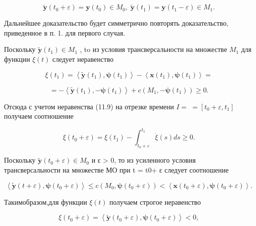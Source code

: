 \documentclass[8pt]{extarticle}
\begin{document}
\[
\widetilde{\mathbf{y}}\left( {{t}_{0} + \varepsilon }\right)  = \mathbf{y}\left( {t}_{0}\right)  \in  {M}_{0},\;\widetilde{\mathbf{y}}\left( {t}_{1}\right)  = \mathbf{y}\left( {{t}_{1} - \varepsilon }\right)  \in  {M}_{1}.
\]

Дальнейшее доказательство будет симметрично повторять доказательство, приведенное в п. 1. для первого случая.

Поскольку \(\widetilde{\mathbf{y}}\left( {t}_{1}\right)  \in  {M}_{1}\) , to из условия трансверсальности на множестве \({M}_{1}\) для функции \(\xi \left( t\right)\) следует неравенство

\[
\xi \left( {t}_{1}\right)  = \left\langle  {\widetilde{\mathbf{y}}\left( {t}_{1}\right) ,\mathbf{\psi }\left( {t}_{1}\right) }\right\rangle   - \left\langle  {\mathbf{x}\left( {t}_{1}\right) ,\mathbf{\psi }\left( {t}_{1}\right) }\right\rangle   =
\]

\[
=  - \left\langle  {\widetilde{\mathbf{y}}\left( {t}_{1}\right) , - \mathbf{\psi }\left( {t}_{1}\right) }\right\rangle   + c\left( {{M}_{1}, - \mathbf{\psi }\left( {t}_{1}\right) }\right)  \geq  0.
\]

Отсюда с учетом неравенства (11.9) на отрезке времени \(I = \; = \left\lbrack  {{t}_{0} + \varepsilon ,{t}_{1}}\right\rbrack\) получаем соотношение

\[
\xi \left( {{t}_{0} + \varepsilon }\right)  = \xi \left( {t}_{1}\right)  - {\int }_{{t}_{0} + \varepsilon }^{{t}_{1}}\dot{\xi }\left( s\right) {ds} \geq  0. \tag{11.12}
\]

Поскольку \(\widetilde{\mathbf{y}}\left( {{t}_{0} + \varepsilon }\right)  \in  {M}_{0}\) и ε > 0, то из усиленного условия трансверсальности на множестве МО при t = t0+ ε следует соотношение

\[
\left\langle  {\widetilde{\mathbf{y}}\left( {t + \varepsilon }\right) ,\mathbf{\psi }\left( {{t}_{0} + \varepsilon }\right) }\right\rangle   \leq  c\left( {{M}_{0},\mathbf{\psi }\left( {{t}_{0} + \varepsilon }\right) }\right)  < \left\langle  {\mathbf{x}\left( {{t}_{0} + \varepsilon }\right) ,\mathbf{\psi }\left( {{t}_{0} + \varepsilon }\right) }\right\rangle  .
\]

Такимобразом,для функции \(\xi \left( t\right)\) получаем строгое неравенство

\[
\xi \left( {{t}_{0} + \varepsilon }\right)  = \left\langle  {\widetilde{\mathbf{y}}\left( {{t}_{0} + \varepsilon }\right) ,\mathbf{\psi }\left( {{t}_{0} + \varepsilon }\right) }\right\rangle   < 0,
\]
\end{document}
